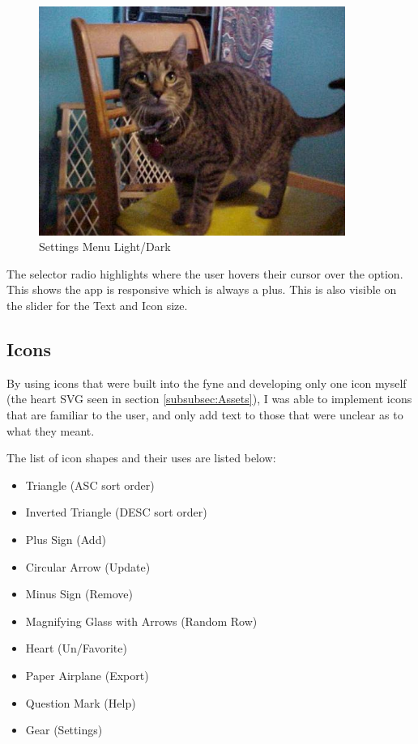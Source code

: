 \begin{figure}[htb]
	\centering
	\includegraphics[width=10cm]{./Images/cats_00001.jpg}
	\caption{Settings Menu Light/Dark}
	\label{fig:DBOperations}
\end{figure}

The selector radio highlights where the user hovers their cursor over
the option. This shows the app is responsive which is always a plus.
This is also visible on the slider for the Text and Icon size.

\subsection{Icons}

By using icons that were built into the fyne and developing only one
icon myself (the heart SVG seen in section \ref{subsubsec:Assets}), I
was able to implement icons that are familiar to the user, and only
add text to those that were unclear as to what they meant.

The list of icon shapes and their uses are listed below:
\begin{itemize}
	\item Triangle (ASC sort order)
	\item Inverted Triangle (DESC sort order)
	\item Plus Sign (Add)
	\item Circular Arrow (Update)
	\item Minus Sign (Remove)
	\item Magnifying Glass with Arrows (Random Row)
	\item Heart (Un/Favorite)
	\item Paper Airplane (Export)
	\item Question Mark (Help)
	\item Gear (Settings)
\end{itemize}

